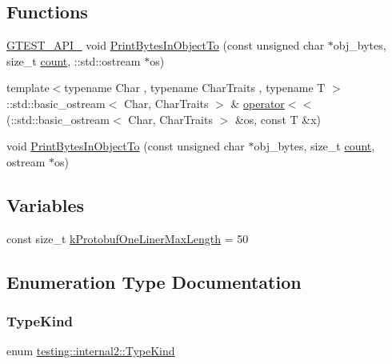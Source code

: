 \subsection*{Functions}
\begin{DoxyCompactItemize}
\item 
\mbox{\hyperlink{gtest-port_8h_aa73be6f0ba4a7456180a94904ce17790}{G\+T\+E\+S\+T\+\_\+\+A\+P\+I\+\_\+}} void \mbox{\hyperlink{namespacetesting_1_1internal2_a9fbf8e07c0f94dc74d6ef5e56cd3c553}{Print\+Bytes\+In\+Object\+To}} (const unsigned char $\ast$obj\+\_\+bytes, size\+\_\+t \mbox{\hyperlink{gmock__stress__test_8cc_afd9db40e3361ae09188795e8cbe19752}{count}}, \+::std\+::ostream $\ast$os)
\item 
{\footnotesize template$<$typename Char , typename Char\+Traits , typename T $>$ }\\\+::std\+::basic\+\_\+ostream$<$ Char, Char\+Traits $>$ \& \mbox{\hyperlink{namespacetesting_1_1internal2_a07dbe129beb8952074f04b599dfce39b}{operator$<$$<$}} (\+::std\+::basic\+\_\+ostream$<$ Char, Char\+Traits $>$ \&os, const T \&x)
\item 
void \mbox{\hyperlink{namespacetesting_1_1internal2_abfb9aa80365f93b952e9a4bea09947a8}{Print\+Bytes\+In\+Object\+To}} (const unsigned char $\ast$obj\+\_\+bytes, size\+\_\+t \mbox{\hyperlink{gmock__stress__test_8cc_afd9db40e3361ae09188795e8cbe19752}{count}}, ostream $\ast$os)
\end{DoxyCompactItemize}
\subsection*{Variables}
\begin{DoxyCompactItemize}
\item 
const size\+\_\+t \mbox{\hyperlink{namespacetesting_1_1internal2_a140c8efd51e63a3def98445bff107518}{k\+Protobuf\+One\+Liner\+Max\+Length}} = 50
\end{DoxyCompactItemize}


\subsection{Enumeration Type Documentation}
\mbox{\label{namespacetesting_1_1internal2_aeb8161b0b3ee503347b0662d7028fd57}} 
\subsubsection{\texorpdfstring{TypeKind}{TypeKind}}
{\footnotesize\ttfamily enum \mbox{\hyperlink{namespacetesting_1_1internal2_aeb8161b0b3ee503347b0662d7028fd57}{testing\+::internal2\+::\+Type\+Kind}}}

